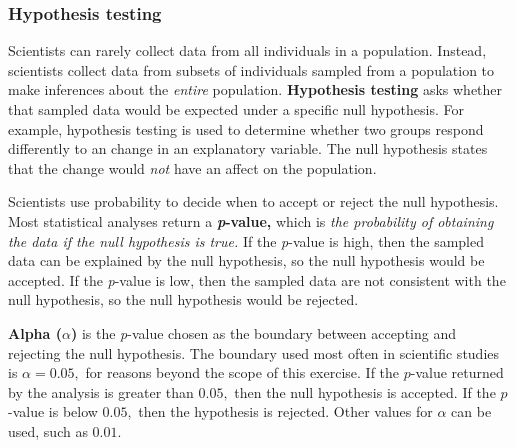 \documentclass[12pt]{exam}
\newcommand*\AnswerBox[2]{%
    \parbox[t][#1]{0.92\textwidth}{%
    \begin{solution}#2\end{solution}}
}
\begin{document}
%
%
%
%
%
\subsubsection*{Hypothesis testing}

Scientists can rarely collect data from all individuals in a population. Instead, scientists collect data from subsets of individuals sampled from a population to make inferences about the \emph{entire} population. \textbf{Hypothesis testing} asks whether that sampled data would be expected under a specific null hypothesis. For example, hypothesis testing is used to determine whether two groups respond differently to an change in an explanatory variable. The null hypothesis states that the change would \emph{not} have an affect on the population.

Scientists use probability to decide when to accept or reject the null hypothesis. Most statistical analyses return a \textbf{\textit{p}-value,} which is \emph{the probability of obtaining the data if the null hypothesis is true.} If the \textit{p}-value is high, then the sampled data can be explained by the null hypothesis, so the null hypothesis would be accepted. If the \textit{p}-value is low, then the sampled data are not consistent with the null hypothesis, so the null hypothesis would be rejected.

\textbf{Alpha ($\alpha$)} is the \textit{p}-value chosen as the boundary between accepting and rejecting the null hypothesis. The boundary used most often in scientific studies is $\alpha = 0.05,$ for reasons beyond the scope of this exercise. If the $p$-value returned by the analysis is greater than $0.05,$ then the null hypothesis is accepted. If the $p$-value is below $0.05,$ then the hypothesis is rejected. Other values for $\alpha$ can be used, such as $0.01.$
\end{document}
